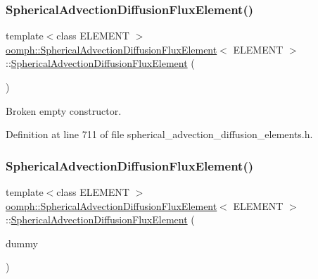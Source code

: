 \subsubsection{\texorpdfstring{Spherical\+Advection\+Diffusion\+Flux\+Element()}{SphericalAdvectionDiffusionFluxElement()}\hspace{0.1cm}{\footnotesize\ttfamily [2/3]}}
{\footnotesize\ttfamily template$<$class E\+L\+E\+M\+E\+NT $>$ \\
\hyperlink{classoomph_1_1SphericalAdvectionDiffusionFluxElement}{oomph\+::\+Spherical\+Advection\+Diffusion\+Flux\+Element}$<$ E\+L\+E\+M\+E\+NT $>$\+::\hyperlink{classoomph_1_1SphericalAdvectionDiffusionFluxElement}{Spherical\+Advection\+Diffusion\+Flux\+Element} (\begin{DoxyParamCaption}{ }\end{DoxyParamCaption})\hspace{0.3cm}{\ttfamily [inline]}}



Broken empty constructor. 



Definition at line 711 of file spherical\+\_\+advection\+\_\+diffusion\+\_\+elements.\+h.

\mbox{\label{classoomph_1_1SphericalAdvectionDiffusionFluxElement_a85e2f9e5a93f978b21cbf6d425d8c991}} 
\subsubsection{\texorpdfstring{Spherical\+Advection\+Diffusion\+Flux\+Element()}{SphericalAdvectionDiffusionFluxElement()}\hspace{0.1cm}{\footnotesize\ttfamily [3/3]}}
{\footnotesize\ttfamily template$<$class E\+L\+E\+M\+E\+NT $>$ \\
\hyperlink{classoomph_1_1SphericalAdvectionDiffusionFluxElement}{oomph\+::\+Spherical\+Advection\+Diffusion\+Flux\+Element}$<$ E\+L\+E\+M\+E\+NT $>$\+::\hyperlink{classoomph_1_1SphericalAdvectionDiffusionFluxElement}{Spherical\+Advection\+Diffusion\+Flux\+Element} (\begin{DoxyParamCaption}\item[{const \hyperlink{classoomph_1_1SphericalAdvectionDiffusionFluxElement}{Spherical\+Advection\+Diffusion\+Flux\+Element}$<$ E\+L\+E\+M\+E\+NT $>$ \&}]{dummy }\end{DoxyParamCaption})\hspace{0.3cm}{\ttfamily [inline]}}



